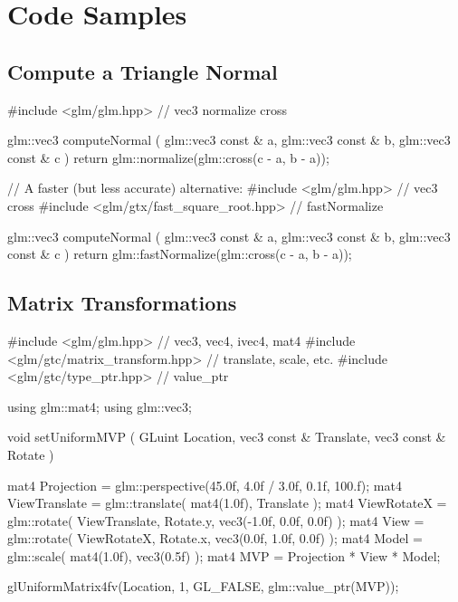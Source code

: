 \documentclass{scrartcl}
\numberwithin{figure}{subsection}
\begin{document}
\newpage{}

\section{Code Samples}

\subsection{Compute a Triangle Normal}

\begin{cppcode}
#include <glm/glm.hpp> // vec3 normalize cross

glm::vec3 computeNormal
(
  glm::vec3 const & a, 
  glm::vec3 const & b,
  glm::vec3 const & c
)
{
  return glm::normalize(glm::cross(c - a, b - a));
}
\end{cppcode}

\begin{cppcode}
// A faster (but less accurate) alternative:
#include <glm/glm.hpp> // vec3 cross
#include <glm/gtx/fast_square_root.hpp> // fastNormalize

glm::vec3 computeNormal
(
  glm::vec3 const & a, 
  glm::vec3 const & b,
  glm::vec3 const & c
)
{
  return glm::fastNormalize(glm::cross(c - a, b - a));
}
\end{cppcode}



\subsection{Matrix Transformations}

\begin{cppcode}
#include <glm/glm.hpp> // vec3, vec4, ivec4, mat4
#include <glm/gtc/matrix_transform.hpp> // translate, scale, etc.
#include <glm/gtc/type_ptr.hpp> // value_ptr

using glm::mat4;
using glm::vec3;

void setUniformMVP
(
  GLuint Location, 
  vec3 const & Translate, 
  vec3 const & Rotate
)
{
  mat4 Projection = glm::perspective(45.0f, 4.0f / 3.0f, 0.1f, 100.f);
  mat4 ViewTranslate = glm::translate(
    mat4(1.0f),
    Translate
  );
  mat4 ViewRotateX = glm::rotate(
    ViewTranslate,
    Rotate.y,
    vec3(-1.0f, 0.0f, 0.0f)
  );
  mat4 View = glm::rotate(
    ViewRotateX,
    Rotate.x,
    vec3(0.0f, 1.0f, 0.0f)
  );
  mat4 Model = glm::scale(
    mat4(1.0f),
    vec3(0.5f)
  );
  mat4 MVP = Projection * View * Model;

  glUniformMatrix4fv(Location, 1, GL_FALSE, glm::value_ptr(MVP));
}
\end{cppcode}
\end{document}
